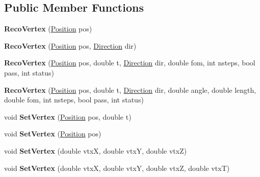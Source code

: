 \subsection*{Public Member Functions}
\begin{DoxyCompactItemize}
\item 
\hypertarget{classRecoVertex_a1b63b5a9f58bf69aa12da2b965398dbc}{{\bfseries Reco\-Vertex} (\hyperlink{classPosition}{Position} pos)}\label{classRecoVertex_a1b63b5a9f58bf69aa12da2b965398dbc}

\item 
\hypertarget{classRecoVertex_aafab78d69771317ec57e0c1ac23b42e0}{{\bfseries Reco\-Vertex} (\hyperlink{classPosition}{Position} pos, \hyperlink{classDirection}{Direction} dir)}\label{classRecoVertex_aafab78d69771317ec57e0c1ac23b42e0}

\item 
\hypertarget{classRecoVertex_aa085ca8edaac50177f2c82696ca1bb50}{{\bfseries Reco\-Vertex} (\hyperlink{classPosition}{Position} pos, double t, \hyperlink{classDirection}{Direction} dir, double fom, int nsteps, bool pass, int status)}\label{classRecoVertex_aa085ca8edaac50177f2c82696ca1bb50}

\item 
\hypertarget{classRecoVertex_a3a85d3d51b10cd64c5540c518022a641}{{\bfseries Reco\-Vertex} (\hyperlink{classPosition}{Position} pos, double t, \hyperlink{classDirection}{Direction} dir, double angle, double length, double fom, int nsteps, bool pass, int status)}\label{classRecoVertex_a3a85d3d51b10cd64c5540c518022a641}

\item 
\hypertarget{classRecoVertex_a9ab6116a0def24036d555e944e44d0c8}{void {\bfseries Set\-Vertex} (\hyperlink{classPosition}{Position} pos, double t)}\label{classRecoVertex_a9ab6116a0def24036d555e944e44d0c8}

\item 
\hypertarget{classRecoVertex_af90c55e1af692ab5c96b27f27daddd2b}{void {\bfseries Set\-Vertex} (\hyperlink{classPosition}{Position} pos)}\label{classRecoVertex_af90c55e1af692ab5c96b27f27daddd2b}

\item 
\hypertarget{classRecoVertex_afcff3ea42291b1b73dfb64aea3436ebe}{void {\bfseries Set\-Vertex} (double vtx\-X, double vtx\-Y, double vtx\-Z)}\label{classRecoVertex_afcff3ea42291b1b73dfb64aea3436ebe}

\item 
\hypertarget{classRecoVertex_a249a154ad1b80f739dde431c3b8e68d1}{void {\bfseries Set\-Vertex} (double vtx\-X, double vtx\-Y, double vtx\-Z, double vtx\-T)}\label{classRecoVertex_a249a154ad1b80f739dde431c3b8e68d1}


\end{DoxyCompactItemize}
